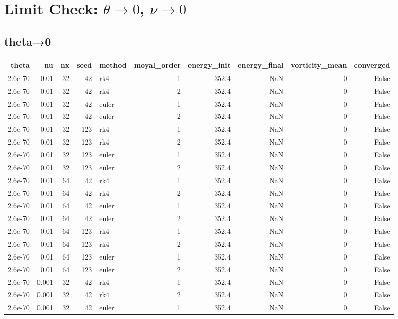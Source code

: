 \section*{Limit Check: $\theta\to0$, $\nu\to0$}
\subsection*{theta→0}
\begin{tabular}{rrrrlrrrrr}
\toprule
theta & nu & nx & seed & method & moyal_order & energy_init & energy_final & vorticity_mean & converged \\
\midrule
2.6e-70 & 0.01 & 32 & 42 & rk4 & 1 & 352.4 & NaN & 0 & False \\
2.6e-70 & 0.01 & 32 & 42 & rk4 & 2 & 352.4 & NaN & 0 & False \\
2.6e-70 & 0.01 & 32 & 42 & euler & 1 & 352.4 & NaN & 0 & False \\
2.6e-70 & 0.01 & 32 & 42 & euler & 2 & 352.4 & NaN & 0 & False \\
2.6e-70 & 0.01 & 32 & 123 & rk4 & 1 & 352.4 & NaN & 0 & False \\
2.6e-70 & 0.01 & 32 & 123 & rk4 & 2 & 352.4 & NaN & 0 & False \\
2.6e-70 & 0.01 & 32 & 123 & euler & 1 & 352.4 & NaN & 0 & False \\
2.6e-70 & 0.01 & 32 & 123 & euler & 2 & 352.4 & NaN & 0 & False \\
2.6e-70 & 0.01 & 64 & 42 & rk4 & 1 & 352.4 & NaN & 0 & False \\
2.6e-70 & 0.01 & 64 & 42 & rk4 & 2 & 352.4 & NaN & 0 & False \\
2.6e-70 & 0.01 & 64 & 42 & euler & 1 & 352.4 & NaN & 0 & False \\
2.6e-70 & 0.01 & 64 & 42 & euler & 2 & 352.4 & NaN & 0 & False \\
2.6e-70 & 0.01 & 64 & 123 & rk4 & 1 & 352.4 & NaN & 0 & False \\
2.6e-70 & 0.01 & 64 & 123 & rk4 & 2 & 352.4 & NaN & 0 & False \\
2.6e-70 & 0.01 & 64 & 123 & euler & 1 & 352.4 & NaN & 0 & False \\
2.6e-70 & 0.01 & 64 & 123 & euler & 2 & 352.4 & NaN & 0 & False \\
2.6e-70 & 0.001 & 32 & 42 & rk4 & 1 & 352.4 & NaN & 0 & False \\
2.6e-70 & 0.001 & 32 & 42 & rk4 & 2 & 352.4 & NaN & 0 & False \\
2.6e-70 & 0.001 & 32 & 42 & euler & 1 & 352.4 & NaN & 0 & False \\

\end{tabular}

